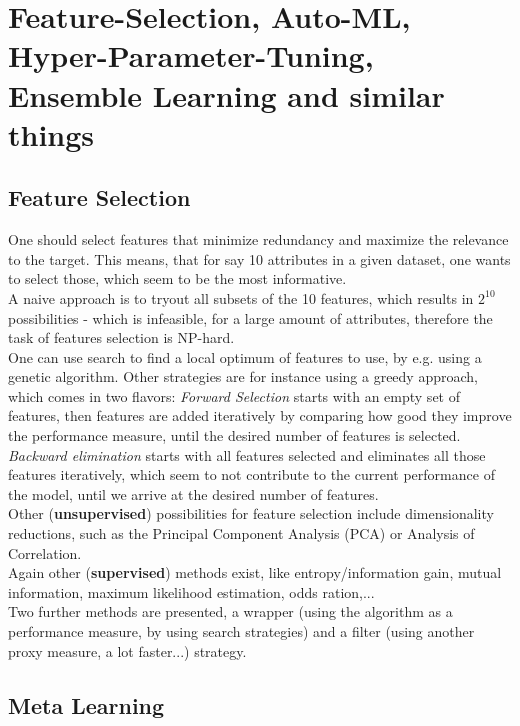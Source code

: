 \documentclass[12pt,a4paper]{article}
\begin{document}
\newpage
\section{Feature-Selection, Auto-ML, Hyper-Parameter-Tuning, Ensemble Learning and similar things}

\subsection{Feature Selection}

\noindent One should select features that minimize redundancy and maximize the relevance to the target. This means, that for say 10 attributes in a given dataset, one wants to select those, which seem to be the most informative.\\
A naive approach is to tryout all subsets of the 10 features, which results in \(2^{10}\) possibilities - which is infeasible, for a large amount of attributes, therefore the task of features selection is NP-hard.\\[1em]
One can use search to find a local optimum of features to use, by e.g. using a genetic algorithm. Other strategies are for instance using a greedy approach, which comes in two flavors: \textit{Forward Selection} starts with an empty set of features, then features are added iteratively by comparing how good they improve the performance measure, until the desired number of features is selected.\\
\textit{Backward elimination} starts with all features selected and eliminates all those features iteratively, which seem to not contribute to the current performance of the model, until we arrive at the desired number of features.\\[1em]
Other (\textbf{unsupervised}) possibilities for feature selection include dimensionality reductions, such as the Principal Component Analysis (PCA) or Analysis of Correlation.\\
Again other (\textbf{supervised}) methods exist, like entropy/information gain, mutual information, maximum likelihood estimation, odds ration,...\\[1em]
Two further methods are presented, a wrapper (using the algorithm as a performance measure, by using search strategies) and a filter (using another proxy measure, a lot faster...) strategy.\\


\subsection{Meta Learning}
\end{document}
